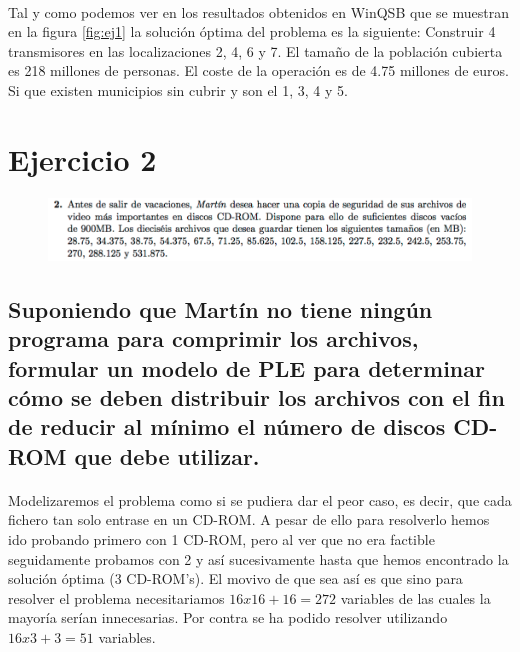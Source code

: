 \documentclass[10pt, a4paper]{article}
\begin{document}
			\paragraph{}
			Tal y como podemos ver en los resultados obtenidos en WinQSB que se muestran en la figura \ref{fig:ej1} la solución óptima del problema es la siguiente:
			\newline
			Construir 4 transmisores en las localizaciones 2, 4, 6 y 7.
			\newline
			El tamaño de la población cubierta es 218 millones de personas.
			\newline
			El coste de la operación es de 4.75 millones de euros.
			\newline
			Si que existen municipios sin cubrir y son el 1, 3, 4 y 5.


	\section{Ejercicio 2}

        \begin{figure}[H]
        \centering
            \includegraphics[width=\textwidth]{res/exercise-2.png}
        \end{figure}


		\subsection{Suponiendo que Martín no tiene ningún programa para comprimir los archivos, formular un modelo de PLE para determinar cómo se deben distribuir los archivos con el fin de reducir al mínimo el número de discos CD-ROM que debe utilizar.}

			\paragraph{}
			Modelizaremos el problema como si se pudiera dar el peor caso, es decir, que cada fichero tan solo entrase en un CD-ROM. A pesar de ello para resolverlo hemos ido probando primero con 1 CD-ROM, pero al ver que no era factible seguidamente probamos con 2 y así sucesivamente hasta que hemos encontrado la solución óptima (3 CD-ROM's). El movivo de que sea así es que sino para resolver el problema necesitariamos $16 x 16 + 16= 272$ variables de las cuales la mayoría serían innecesarias. Por contra se ha podido resolver utilizando $16 x 3 + 3 = 51$ variables.
\end{document}
